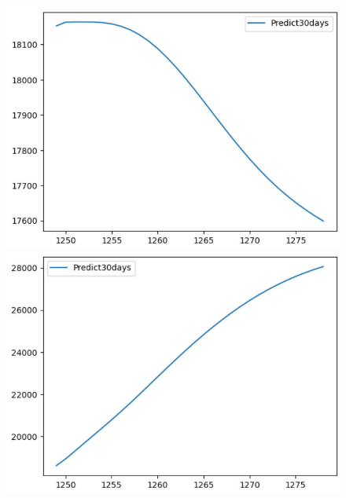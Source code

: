 \begin{figure}[H]
\begin{minipage}{0.15\textwidth}
    \includegraphics[width=1\textwidth]{resources/chapter-5/predicted/EXB_LSTM_7_3_next30days.jpg}
    \end{minipage}
    \hfill
    \begin{minipage}{0.15\textwidth}
    \centering
    \includegraphics[width=1\textwidth]{resources/chapter-5/predicted/EXB_LSTM_8_2_next30days.jpg}
    \end{minipage}
    \hfill
        \begin{minipage}{0.15\textwidth}
    \centering

\end{minipage}
\end{figure}

